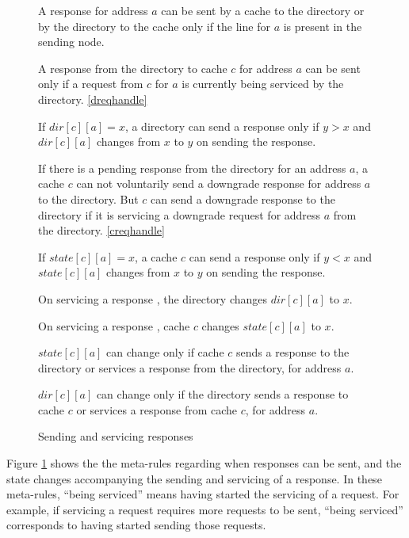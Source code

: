 \begin{figure}
\begin{cons}
A response for address $a$ can be sent by a cache to the directory or by the
directory to the cache only if the line for $a$ is present in the sending node.
\end{cons}
\begin{cons}
A response from the directory to cache $c$ for address $a$ can be sent only if a
request from $c$ for $a$ is currently being serviced by the directory.
\ref{dreqhandle}
\end{cons}
\begin{cons}
If $dir[c][a] = x$, a directory can send a response  only if
$y > x$ and $dir[c][a]$ changes from $x$ to $y$ on sending the response.
\end{cons}
\begin{cons}
If there is a pending response from the directory for an address $a$, a cache
$c$ can not voluntarily send a downgrade response for address $a$ to the
directory. But $c$ can send a downgrade response to the directory if it is
servicing a downgrade request for address $a$ from the directory.
\ref{creqhandle}
\end{cons}
\begin{cons}
If $state[c][a] = x$, a cache $c$ can send a response  only if
$y < x$ and $state[c][a]$ changes from $x$ to $y$ on sending the response.
\end{cons}
\begin{cons}
On servicing a response , the directory changes $dir[c][a]$
to $x$.
\end{cons}
\begin{cons}
On servicing a response , cache $c$ changes $state[c][a]$
to $x$.
\end{cons}
\begin{cons}
$state[c][a]$ can change only if cache $c$ sends a response to the directory or
services a response from the directory, for address $a$.
\end{cons}
\begin{cons}
$dir[c][a]$ can change only if the directory sends a response to cache $c$ or
services a response from cache $c$, for address $a$.
\end{cons}
\caption{Sending and servicing responses}
\label{sendRespPre}
\end{figure}

Figure \ref{sendRespPre} shows the the meta-rules regarding when responses can
be sent, and the state changes accompanying the sending and servicing of a
response. In these meta-rules, ``being serviced'' means having started the
servicing of a request.  For example, if servicing a request requires more
requests to be sent, ``being serviced'' corresponds to having started sending
those requests.

